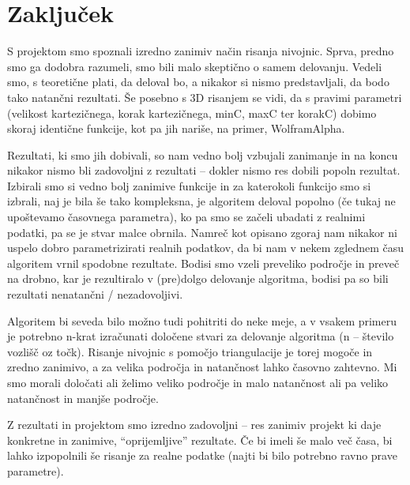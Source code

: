 \documentclass[a4paper,11pt]{article}
\begin{document}
\section{Zaključek}

S projektom smo spoznali izredno zanimiv način risanja nivojnic. Sprva, predno smo ga dodobra razumeli, smo bili malo skeptično o samem delovanju. Vedeli smo, s teoretične plati, da deloval bo, a nikakor si nismo predstavljali, da bodo tako natančni rezultati. Še posebno s 3D risanjem se vidi, da s pravimi parametri (velikost kartezičnega, korak kartezičnega, minC, maxC ter korakC) dobimo skoraj identične funkcije, kot pa jih nariše, na primer, WolframAlpha.
\par
Rezultati, ki smo jih dobivali, so nam vedno bolj vzbujali zanimanje in na koncu nikakor nismo bli zadovoljni z rezultati – dokler nismo res dobili popoln rezultat. Izbirali smo si vedno bolj zanimive funkcije in za katerokoli funkcijo smo si izbrali, naj je bila še tako kompleksna, je algoritem deloval popolno (če tukaj ne upoštevamo časovnega parametra), ko pa smo se začeli ubadati z realnimi podatki, pa se je stvar malce obrnila. Namreč kot opisano zgoraj nam nikakor ni uspelo dobro parametrizirati realnih podatkov, da bi nam v nekem zglednem času algoritem vrnil spodobne rezultate. Bodisi smo vzeli preveliko področje in preveč na drobno, kar je rezultiralo v (pre)dolgo delovanje algoritma, bodisi pa so bili rezultati nenatančni / nezadovoljivi.
\par
Algoritem bi seveda bilo možno tudi pohitriti do neke meje, a v vsakem primeru je potrebno n-krat izračunati določene stvari za delovanje algoritma (n – število vozlišč oz točk). Risanje nivojnic s pomočjo triangulacije je torej mogoče in zredno zanimivo, a za velika področja in natančnost lahko časovno zahtevno. Mi smo morali določati ali želimo veliko področje in malo natančnost ali pa veliko natančnost in manjše področje.
\par
Z rezultati in projektom smo izredno zadovoljni – res zanimiv projekt ki daje konkretne in zanimive, ``oprijemljive'' rezultate. Če bi imeli še malo več časa, bi lahko izpopolnili še risanje za realne podatke (najti bi bilo potrebno ravno prave parametre).
\end{document}
